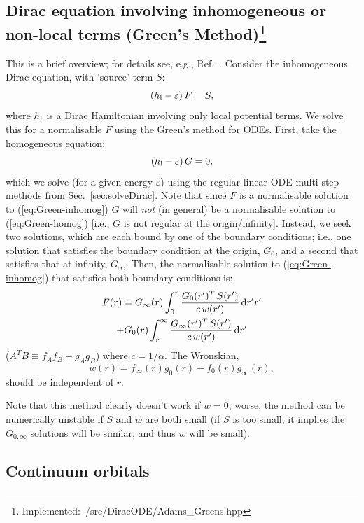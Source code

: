 \documentclass[10pt,twocolumn,a4paper]{article}%
\newcommand{\be}{\begin{equation}}
\newcommand{\ee}{\end{equation}}
\def\d{\ensuremath{{\rm d}}}
\def\en{\ensuremath{\varepsilon}}
\begin{document}
\subsection[Dirac equation involving inhomogeneous terms]{Dirac equation involving inhomogeneous or non-local terms (Green's Method)\footnote{Implemented:~/src/DiracODE/Adams\_Greens.hpp}}


This is a brief overview; for details see, e.g., Ref.~\cite{Arfken2013}.
Consider the inhomogeneous Dirac equation, with `source' term $S$:
\be\label{eq:Green-inhomog}
\left( h_{\rm l}- \en\right)F = S,
\ee
where $h_{\rm l}$ is a Dirac Hamiltonian involving only local potential terms.
We solve this for a normalisable $F$ using the Green's method for ODEs.
First, take the homogeneous equation:
\be\label{eq:Green-homog}
\left(h_{\rm l}- \en\right) G = 0,
\ee
which we solve (for a given energy $\en$) using the regular linear ODE multi-step methods from Sec.~\ref{sec:solveDirac}.
Note that since $F$ is a normalisable solution to (\ref{eq:Green-inhomog}) $G$ will {\em not} (in general) be a normalisable solution to (\ref{eq:Green-homog}) [i.e., $G$ is not regular at the origin/infinity].
Instead, we seek two solutions, which are each bound by one of the boundary conditions; i.e., one solution that satisfies the boundary condition at the origin, $G_0$, and a second that satisfies that at infinity, $G_\infty$.
Then, the normalisable solution to (\ref{eq:Green-inhomog}) that satisfies both boundary conditions is:
\begin{multline}\label{eq:GreensSolution}
F(r) = G_\infty(r) \int_0^r \frac{G_0(r')^T \, S(r')}{c\,w(r')}\,\d r'r'
\\
+  G_0(r) \int_r^\infty \frac{G_\infty(r')^T \, S(r')}{c\,w(r')}\,\d r'
\end{multline}
($A^T B \equiv f_A f_B + g_A g_B$)
where $c=1/\alpha$. 
The Wronskian,
\be\label{eq:Green-Wronskian}
w(r) = f_\infty(r) g_0(r) - f_0(r)g_\infty(r),
\ee
should be independent of $r$.


Note that this method clearly doesn't work if $w=0$; worse, the method can be numerically unstable if $S$ and $w$ are both small (if $S$ is too small, it implies the $G_{0,\infty}$ solutions will be similar, and thus $w$ will be small).



\subsection{Continuum orbitals}
\end{document}
